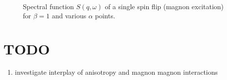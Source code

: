 \documentclass[12pt, a4paper]{article}
\begin{document}
\begin{figure}
{	}
	\\
	\caption{Spectral function $S(q,\omega)$ of a single spin flip (magnon excitation) for $\beta = 1$ and various $\alpha$ points.}\label{fig:XXZ_alpha_dep}
\end{figure}

\section{TODO}
\begin{enumerate}
	\item investigate interplay of anisotropy and magnon magnon interactions
\end{enumerate}



\end{document}
